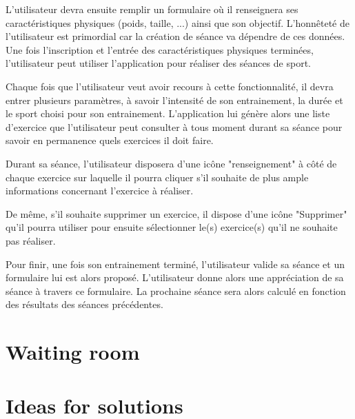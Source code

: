 L'utilisateur devra ensuite remplir un formulaire où il renseignera ses caractéristiques physiques (poids, taille, ...) ainsi que son objectif. L'honnêteté de l'utilisateur est primordial car la création de séance va dépendre de ces données. Une fois l'inscription et l'entrée des caractéristiques physiques terminées, l'utilisateur peut utiliser l'application pour réaliser des séances de sport.

Chaque fois que l'utilisateur veut avoir recours à cette fonctionnalité, il devra entrer plusieurs paramètres, à savoir l'intensité de son entrainement, la durée et le sport choisi pour son entrainement. L'application lui génère alors une liste d'exercice que l'utilisateur peut  consulter à tous moment durant sa séance pour savoir en permanence quels exercices il doit faire.

Durant sa séance, l'utilisateur disposera d'une icône "renseignement" à côté de chaque exercice sur laquelle il pourra cliquer s'il souhaite de plus ample informations concernant l'exercice à réaliser.

De même, s'il souhaite supprimer un exercice, il dispose d'une icône "Supprimer" qu'il pourra utiliser pour ensuite sélectionner le(s) exercice(s) qu'il ne souhaite pas réaliser. 

Pour finir, une fois son entrainement terminé, l'utilisateur valide sa séance et un formulaire lui est alors proposé. L'utilisateur donne alors une appréciation de sa séance à travers ce formulaire. La prochaine séance sera alors calculé en fonction des résultats des séances précédentes.

\section{Waiting room}

\section{Ideas for solutions}

